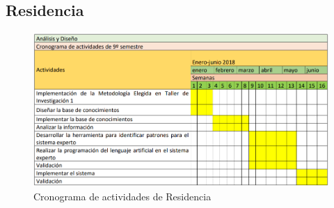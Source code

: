     \subsection{Residencia}

    \begin{figure}[h]
      \centering
      \includegraphics[scale=.7]{lib/assets/cronograma-8-9-2}
      \caption{Cronograma de actividades de Residencia}
    \end{figure}
